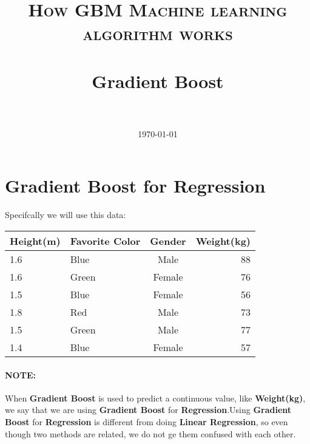 \documentclass[12pt, a4paper]{article} %
\title{	
\normalfont \normalsize 
\textsc{How GBM Machine learning algorithm works} \\ [25pt] %
\horrule{0.5pt} \\[0.4cm] %
\huge Gradient Boost\\ %
\horrule{2pt} \\[0.5cm] %
}
\author{} %
\date{\today} %
\begin{document}
\maketitle %


\section{Gradient Boost for Regression}
Specifcally we will use this data:

\begin{table}[h!]
\begin{center}
\begin{tabular}{m|l|c|r} %
    
    \hline
    \hline
    
         \textbf{Height(m)}
     
       & \textbf{Favorite Color}
      
       & \textbf{Gender}
       
       & \textbf{Weight(kg)}
       
      \\
      
      \hline
      \hline
      
      1.6 & Blue  & Male   & 88\\
      1.6 & Green & Female & 76\\
      1.5 & Blue  & Female & 56\\
      1.8 & Red   & Male   & 73\\
      1.5 & Green & Male   & 77\\
      1.4 & Blue  & Female & 57\\
      
      \hline
      \hline
      
\end{tabular}
\end{center}
\end{table}

\paragraph{NOTE:} When \textbf{Gradient Boost} is used to predict a continuous value, like \textbf{Weight(kg)}, we say that we are using \textbf{Gradient Boost} for \textbf{Regression}.Using \textbf{Gradient Boost} for \textbf{Regression} is different from doing \textbf{Linear Regression}, so even though two methods are related, we do not ge them confused with each other.
\end{document}

